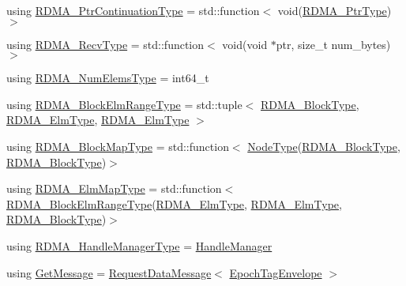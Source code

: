 \begin{DoxyCompactItemize}
\item 
using \hyperlink{namespacevt_1_1rdma_a6e46099fefaf428990d215e6e6d12645}{R\+D\+M\+A\+\_\+\+Ptr\+Continuation\+Type} = std\+::function$<$ void(\hyperlink{namespacevt_a9e2c953286c7616f7c218e9951790776}{R\+D\+M\+A\+\_\+\+Ptr\+Type})$>$
\item 
using \hyperlink{namespacevt_1_1rdma_aa07fa86d8eca8853254b40fc0e565726}{R\+D\+M\+A\+\_\+\+Recv\+Type} = std\+::function$<$ void(void $\ast$ptr, size\+\_\+t num\+\_\+bytes)$>$
\item 
using \hyperlink{namespacevt_1_1rdma_aff1991e64aa5ac8d63d7dea0a82aaff3}{R\+D\+M\+A\+\_\+\+Num\+Elems\+Type} = int64\+\_\+t
\item 
using \hyperlink{namespacevt_1_1rdma_a8320f97b4a2866df60d9778486dbcd0f}{R\+D\+M\+A\+\_\+\+Block\+Elm\+Range\+Type} = std\+::tuple$<$ \hyperlink{namespacevt_ae54d2ca8f6bb4d65faf65118c82cd6f7}{R\+D\+M\+A\+\_\+\+Block\+Type}, \hyperlink{namespacevt_a2c2a902092b72056f70210c159f966f0}{R\+D\+M\+A\+\_\+\+Elm\+Type}, \hyperlink{namespacevt_a2c2a902092b72056f70210c159f966f0}{R\+D\+M\+A\+\_\+\+Elm\+Type} $>$
\item 
using \hyperlink{namespacevt_1_1rdma_a049e294a5236ad30692253d5f82886c9}{R\+D\+M\+A\+\_\+\+Block\+Map\+Type} = std\+::function$<$ \hyperlink{namespacevt_a866da9d0efc19c0a1ce79e9e492f47e2}{Node\+Type}(\hyperlink{namespacevt_ae54d2ca8f6bb4d65faf65118c82cd6f7}{R\+D\+M\+A\+\_\+\+Block\+Type}, \hyperlink{namespacevt_ae54d2ca8f6bb4d65faf65118c82cd6f7}{R\+D\+M\+A\+\_\+\+Block\+Type})$>$
\item 
using \hyperlink{namespacevt_1_1rdma_a6798ab36a5dcb8749c25dff719f9ce07}{R\+D\+M\+A\+\_\+\+Elm\+Map\+Type} = std\+::function$<$ \hyperlink{namespacevt_1_1rdma_a8320f97b4a2866df60d9778486dbcd0f}{R\+D\+M\+A\+\_\+\+Block\+Elm\+Range\+Type}(\hyperlink{namespacevt_a2c2a902092b72056f70210c159f966f0}{R\+D\+M\+A\+\_\+\+Elm\+Type}, \hyperlink{namespacevt_a2c2a902092b72056f70210c159f966f0}{R\+D\+M\+A\+\_\+\+Elm\+Type}, \hyperlink{namespacevt_ae54d2ca8f6bb4d65faf65118c82cd6f7}{R\+D\+M\+A\+\_\+\+Block\+Type})$>$
\item 
using \hyperlink{namespacevt_1_1rdma_a09c31fc860965bddd7a22f6adceb96fd}{R\+D\+M\+A\+\_\+\+Handle\+Manager\+Type} = \hyperlink{structvt_1_1rdma_1_1_handle_manager}{Handle\+Manager}
\item 
using \hyperlink{namespacevt_1_1rdma_acce0da4c9ea1233c3f132c1971943653}{Get\+Message} = \hyperlink{structvt_1_1rdma_1_1_request_data_message}{Request\+Data\+Message}$<$ \hyperlink{namespacevt_af23b58014ced6898422213a0e5e6a27a}{Epoch\+Tag\+Envelope} $>$

\end{DoxyCompactItemize}
